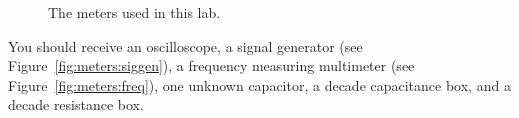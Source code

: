 \documentclass[12pt]{article}
\begin{document}
\begin{figure}
  \centering
   \qquad
  \caption{The meters used in this lab.}
  \label{fig:meters}
\end{figure}
You should receive an oscilloscope, a signal generator (see
Figure~\ref{fig:meters:siggen}), a frequency measuring multimeter (see
Figure~\ref{fig:meters:freq}), one unknown capacitor, a decade
capacitance box, and a decade resistance box.
\end{document}
